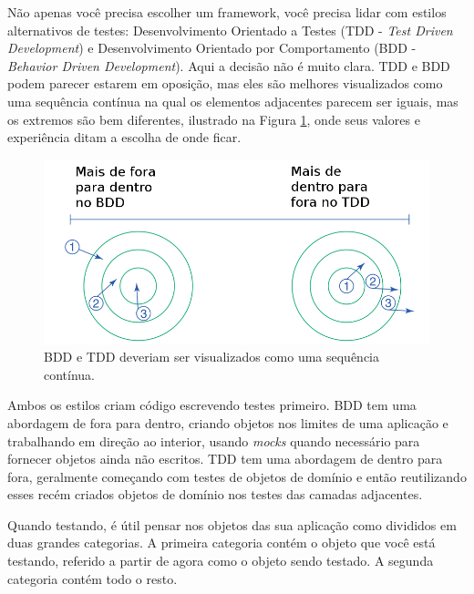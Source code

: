 Não apenas você precisa escolher um framework, você precisa lidar com estilos alternativos de testes:   Desenvolvimento Orientado a Testes (TDD - \textit{Test Driven Development}) e Desenvolvimento Orientado por Comportamento (BDD - \textit{Behavior Driven Development}). Aqui a decisão não é muito clara. TDD e BDD podem parecer estarem em oposição, mas eles são melhores visualizados como uma sequência contínua na qual os elementos adjacentes parecem ser iguais, mas os extremos são bem diferentes, ilustrado na Figura \ref{img:bdd_e_tdd}, onde seus valores e experiência ditam a escolha de onde ficar.

\begin{figure}[!htbp]
  \center
  \includegraphics[scale=0.40]{imagens/bdd_e_tdd.png}
  \caption{BDD e TDD deveriam ser visualizados como uma sequência contínua.}
  \label{img:bdd_e_tdd}
\end{figure}

Ambos os estilos criam código escrevendo testes primeiro. BDD tem uma abordagem de fora para dentro, criando objetos nos limites de uma aplicação e trabalhando em direção ao interior, usando \textit{mocks} quando necessário para fornecer objetos ainda não escritos. TDD tem uma abordagem de dentro para fora, geralmente começando com testes de objetos de domínio e então reutilizando esses recém criados objetos de domínio nos testes das camadas adjacentes.

Quando testando, é útil pensar nos objetos das sua aplicação como divididos em duas grandes categorias. A primeira categoria contém o objeto que você está testando, referido a partir de agora como o objeto sendo testado. A segunda categoria contém todo o resto.
